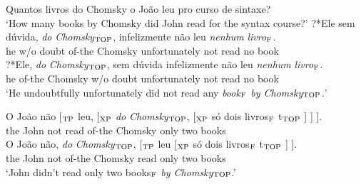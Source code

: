 \documentclass[output=paper]{langscibook}
\begin{document}
\begin{exe}
\ex \label{lacerda39}
\begin{xlist}
 \label{lacerda39A}
Quantos livros do Chomsky o João leu pro curso de sintaxe?\\
‘How many books by Chomsky did John read for the syntax course?’
 \label{lacerda39B1}
\gll ?*Ele 	sem dúvida, 	\emph{do} 	\emph{Chomsky}$_{\textnormal{TOP}}$, 	infelizmente 	não 	leu 	\emph{nenhum} 	\emph{livro}$_{\textnormal{F}}$.\\
he	w/o 	doubt 	of-the	Chomsky 	unfortunately	not 	read 	no 	book\\
 \label{lacerda39B2}
\gll ?*Ele, 	\emph{do} 	\emph{Chomsky}$_{\textnormal{TOP}}$, 	sem 	dúvida 	infelizmente 	não 	leu 	\emph{nenhum} 	\emph{livro}$_{\textnormal{F}}$.\\
he	of-the 	Chomsky 	w/o 	doubt 	unfortunately not 	read 	no 	book\\
\glt ‘He undoubtfully unfortunately did not read any \emph{book$_{\textnormal{F}}$ by Chomsky$_{\textnormal{TOP}}$.}’

\end{xlist}

\ex \label{lacerda40}
\begin{xlist}
\ex \label{lacerda40a}
\gll O 	João 	não 	[$_{\textnormal{TP}}$ 	leu, [$_{\textnormal{XP}}$ 	\emph{do} 	\emph{Chomsky}$_{\textnormal{TOP}}$, [$_{\textnormal{XP}}$ 	só 	dois 	livros$_{\textnormal{F}}$ 	t$_{\textnormal{TOP}}$ ] ] ].\\
the 	John 	not	{}	read {}		of-the	Chomsky	{}	only	two 	books\\
\ex \label{lacerda40b}
\gll *O 	João 	não, \emph{do} \emph{Chomsky}$_{\textnormal{TOP}}$, 	[$_{\textnormal{TP}}$ 	leu 	[$_{\textnormal{XP}}$ só 	dois 	livros$_{\textnormal{F}}$ \hspace{2mm}	t$_{\textnormal{TOP}}$ ] ].\\
the 	John	not	of-the	Chomsky	{}	read	{}	only	two 	books\\
\glt `John didn’t read only two books$_{\textnormal{F}}$ \emph{by Chomsky$_{\textnormal{TOP}}$}.’

\end{xlist}


\end{exe}
\end{document}
